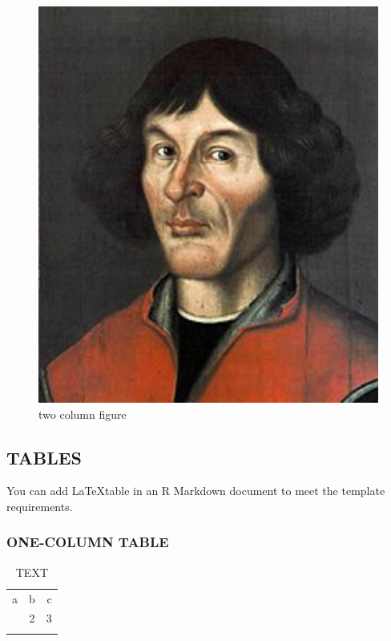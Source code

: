 \documentclass[gc, manuscript]{copernicus}
\begin{document}
\begin{figure}
\includegraphics[width=12cm]{Nikolaus_Kopernikus} \caption{two column figure}\label{fig:unnamed-chunk-6}
\end{figure}

\subsection{TABLES}

You can add \LaTeX table in an R Markdown document to meet the template
requirements.

\subsubsection{ONE-COLUMN TABLE}

\begin{table}[t]
\caption{TEXT}
\begin{tabular}{l c r}
\tophline

a & b & c \\
\middlehline
1 & 2 & 3 \\

\bottomhline
\end{tabular}
\end{table}
\end{document}
